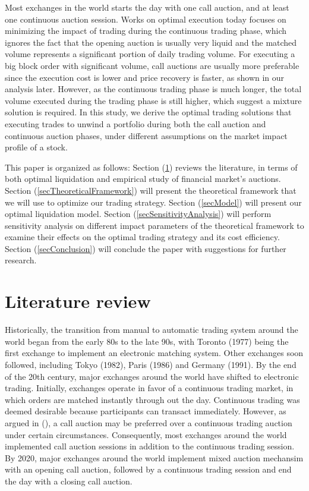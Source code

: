 \documentclass{article}
\begin{document}
Most exchanges in the world starts the day with one call auction, and at least one continuous auction session. Works on optimal execution today focuses on minimizing the impact of trading during the continuous trading phase, which ignores the fact that the opening auction is usually very liquid and the matched volume represents a significant portion of daily trading volume. For executing a big block order with significant volume, call auctions are usually more preferable since the execution cost is lower and price recovery is faster, as shown in our analysis later. However, as the continuous trading phase is much longer, the total volume executed during the trading phase is still higher, which suggest a mixture solution is required. In this study, we derive the optimal trading solutions that executing trades to unwind a portfolio during both the call auction and continuous auction phases, under different assumptions on the market impact profile of a stock.

This paper is organized as follows: Section (\ref{secReview}) reviews the literature, in terms of both optimal liquidation and empirical study of financial market's auctions. Section (\ref{secTheoreticalFramework}) will present the theoretical framework that we will use to optimize our trading strategy. Section (\ref{secModel}) will present our optimal liquidation model. Section (\ref{secSensitivityAnalysis}) will perform sensitivity analysis on different impact parameters of the theoretical framework to examine their effects on the optimal trading strategy and its cost efficiency. Section (\ref{secConclusion}) will conclude the paper with suggestions for further research.

\section{Literature review}\label{secReview}

Historically, the transition from manual to automatic trading system around the world began from the early 80s to the late 90s, with Toronto (1977) being the first exchange to implement an electronic matching system. Other exchanges soon followed, including Tokyo (1982), Paris (1986) and Germany (1991). By the end of the 20th century, major exchanges around the world have shifted to electronic trading. Initially, exchanges operate in favor of a continuous trading market, in which orders are matched instantly through out the day. Continuous trading was deemed desirable because participants can transact immediately. However, as argued in (\cite{Economides1995}), a call auction may be preferred over a continuous trading auction under certain circumstances. Consequently, most exchanges around the world implemented call auction sessions in addition to the continuous trading session. By 2020, major exchanges around the world implement mixed auction mechansim with an opening call auction, followed by a continuous trading session and end the day with a closing call auction.
\end{document}
